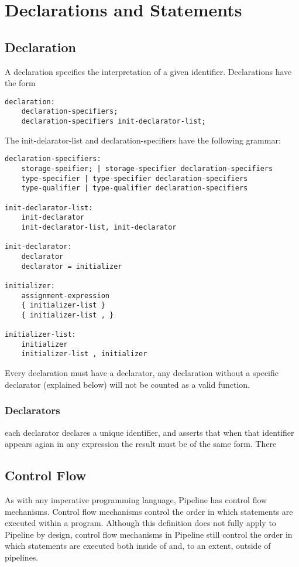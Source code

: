 \documentclass[./LRM_main.tex]{subfiles}
\begin{document}


\chapter{Declarations and Statements}
\section{Declaration}
A declaration specifies the interpretation of a given identifier. Declarations have the form
\begin{lstlisting}
declaration:
	declaration-specifiers;
	declaration-specifiers init-declarator-list;
\end{lstlisting}
The init-delarator-list and declaration-specifiers have the following grammar:
\begin{lstlisting}
declaration-specifiers:
	storage-speifier; | storage-specifier declaration-specifiers
	type-specifier | type-specifier declaration-specifiers
	type-qualifier | type-qualifier declaration-specifiers
	
init-declarator-list:
	init-declarator
	init-declarator-list, init-declarator
	
init-declarator:
	declarator
	declarator = initializer

initializer:
	assignment-expression
	{ initializer-list }
	{ initializer-list , }

initializer-list:
	initializer
	initializer-list , initializer
\end{lstlisting}
Every declaration must have a declarator, any declaration without a specific declarator (explained below) will not be counted as a valid function.
\subsection{Declarators}
each declarator declares a unique identifier, and asserts that when that identifier appears agian in any expression the result must be of the same form. There 
\section{Control Flow}
As with any imperative programming language, Pipeline has control flow mechanisms. Control flow mechanisms control the order in which statements are executed within a program. Although this definition does not fully apply to Pipeline by design, control flow mechanisms in Pipeline still control the order in which statements are executed both inside of and, to an extent, outside of pipelines.
\end{document}
